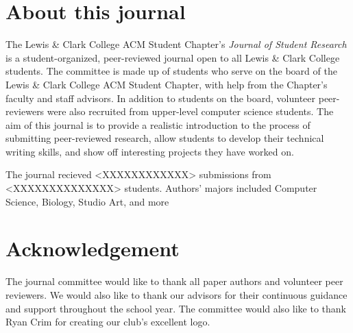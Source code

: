 \documentclass[12pt]{article}
\begin{document}
\section{About this journal}
The Lewis \& Clark College ACM Student Chapter's \textit{Journal of Student Research} is a student-organized, peer-reviewed journal open to all Lewis \& Clark College students. The committee is made up of students who serve on the board of the Lewis \& Clark College ACM Student Chapter, with help from the Chapter's faculty and staff advisors. In addition to students on the board, volunteer peer-reviewers were also recruited from upper-level computer science students. The aim of this journal is to provide a realistic introduction to the process of submitting peer-reviewed research, allow students to develop their technical writing skills, and show off interesting projects they have worked on.

The journal recieved <XXXXXXXXXXXX> submissions from <XXXXXXXXXXXXXX> students. Authors' majors included Computer Science, Biology, Studio Art, and more


\section{Acknowledgement}

The journal committee would like to thank all paper authors and volunteer peer reviewers. We would also like to thank our advisors for their continuous guidance and support throughout the school year. The committee would also like to thank Ryan Crim for creating our club's excellent logo.

\newpage
\end{document}
